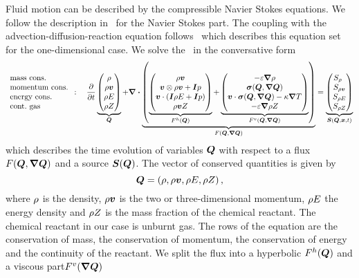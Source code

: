 Fluid motion can be described by the compressible Navier Stokes equations.
We follow the description in~\cite{dumbser2010arbitrary} for the Navier Stokes part.
The coupling with the advection-diffusion-reaction equation follows~\cite{hidalgo2011ader} which describes this equation set for the one-dimensional case.
We solve the \pde\ in the conversative form 
\begin{equation}
 \begin{array}{l}
 \text{mass cons.} \\
 \text{momentum cons.} \\
 \text{energy cons.} \\
 \text{cont.\ gas} 
\end{array}
:
\quad
  \pdv{}{t}
  \underbrace{
  \begin{pmatrix}
    \Qrho\\
    \Qj\\
    \QE\\
    \QZ
    \end{pmatrix}}_{\Q}
  +
  \divergence{
  \underbrace{
  \left(
   \underbrace{\hyperFluxDef}_{\hyperFlux(\Q)}
+
\underbrace{\viscFluxDef}_{\viscFlux(\Q, \gradQ)}
  \right)}_{\flux(\Q, \gradQ)}}
 =
  \underbrace{
  \begin{pmatrix}
    \source[\Qrho\phantom{\Qrho}]\\
    \source[\Qj]\\
    \source[\QE]\\
    \source[\QZ]
    \end{pmatrix}}_{\source(\Q, \bm{x}, t)}
\end{equation}
which describes the time evolution of variables $\bm{Q}$ with respect to a flux $\flux(\Q, \gradQ)$ and a source $\source(\Q)$.
The vector of conserved quantities is given by
\begin{equation}
  \label{eq:conserved-variables}
 \bm{Q} = \left( \rho, \rho \bm{v}, \rho E, \rho Z \right),
\end{equation}
where $\rho$ is the density, $\rho \bm{v}$ is the two or three-dimensional momentum, $\rho E$ the energy density and $\rho Z$ is the mass fraction of the chemical reactant.
The chemical reactant in our case is unburnt gas.
The rows of the equation are the conservation of mass, the conservation of momentum, the conservation of energy and the continuity of the reactant.
We split the flux into a hyperbolic $F^{h}(\bm{Q})$ and a viscous part$\viscFlux(\gradQ)$


